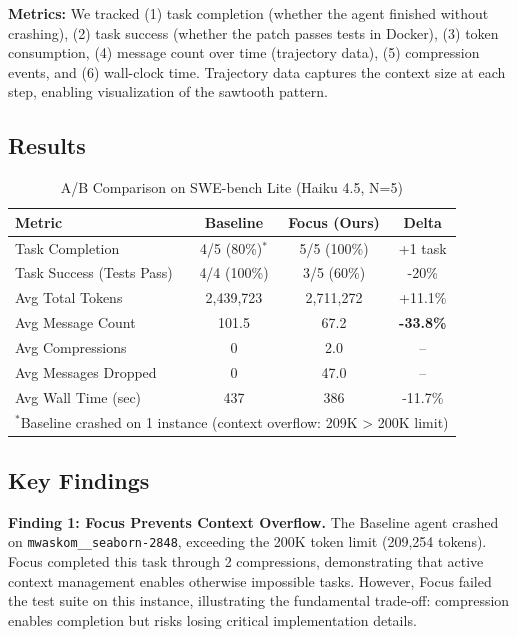 \documentclass[conference]{IEEEtran}
\begin{document}
\textbf{Metrics:} We tracked (1) task completion (whether the agent finished without crashing), (2) task success (whether the patch passes tests in Docker), (3) token consumption, (4) message count over time (trajectory data), (5) compression events, and (6) wall-clock time. Trajectory data captures the context size at each step, enabling visualization of the sawtooth pattern.

\subsection{Results}

\begin{table}[htbp]
\caption{A/B Comparison on SWE-bench Lite (Haiku 4.5, N=5)}
\begin{center}
\begin{tabular}{lccc}
\toprule
\textbf{Metric} & \textbf{Baseline} & \textbf{Focus (Ours)} & \textbf{Delta} \\
\midrule
Task Completion & 4/5 (80\%)$^*$ & 5/5 (100\%) & +1 task \\
Task Success (Tests Pass) & 4/4 (100\%) & 3/5 (60\%) & -20\% \\
Avg Total Tokens & 2,439,723 & 2,711,272 & +11.1\% \\
Avg Message Count & 101.5 & 67.2 & \textbf{-33.8\%} \\
Avg Compressions & 0 & 2.0 & -- \\
Avg Messages Dropped & 0 & 47.0 & -- \\
Avg Wall Time (sec) & 437 & 386 & -11.7\% \\
\bottomrule
\multicolumn{4}{l}{\small $^*$Baseline crashed on 1 instance (context overflow: 209K > 200K limit)} \\
\end{tabular}
\label{tab1}
\end{center}
\end{table}

\subsection{Key Findings}

\textbf{Finding 1: Focus Prevents Context Overflow.} The Baseline agent crashed on \texttt{mwaskom\_\_seaborn-2848}, exceeding the 200K token limit (209,254 tokens). Focus completed this task through 2 compressions, demonstrating that active context management enables otherwise impossible tasks. However, Focus failed the test suite on this instance, illustrating the fundamental trade-off: compression enables completion but risks losing critical implementation details.
\end{document}
